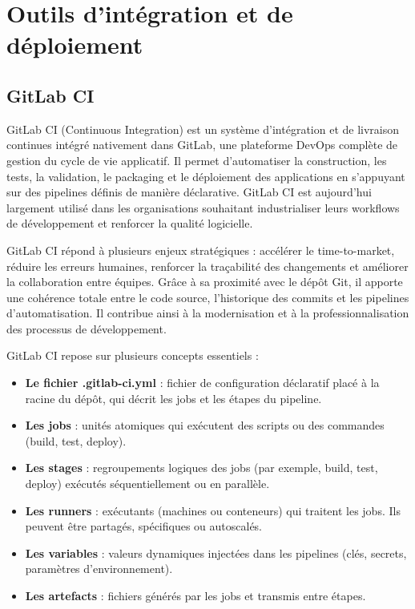 \thispagestyle{mainmatter}

\section{Outils d’intégration et de déploiement}
\subsection{GitLab CI}

GitLab CI (Continuous Integration) est un système d’intégration et de livraison continues intégré nativement dans GitLab, une plateforme DevOps complète de gestion du cycle de vie applicatif. Il permet d’automatiser la construction, les tests, la validation, le packaging et le déploiement des applications en s’appuyant sur des pipelines définis de manière déclarative. GitLab CI est aujourd’hui largement utilisé dans les organisations souhaitant industrialiser leurs workflows de développement et renforcer la qualité logicielle.

GitLab CI répond à plusieurs enjeux stratégiques  : accélérer le time-to-market, réduire les erreurs humaines, renforcer la traçabilité des changements et améliorer la collaboration entre équipes. Grâce à sa proximité avec le dépôt Git, il apporte une cohérence totale entre le code source, l’historique des commits et les pipelines d’automatisation. Il contribue ainsi à la modernisation et à la professionnalisation des processus de développement.

GitLab CI repose sur plusieurs concepts essentiels  :
\begin{itemize}
	\item \textbf{Le fichier .gitlab-ci.yml}  : fichier de configuration déclaratif placé à la racine du dépôt, qui décrit les jobs et les étapes du pipeline.
	\item \textbf{Les jobs}  : unités atomiques qui exécutent des scripts ou des commandes (build, test, deploy).
	\item \textbf{Les stages}  : regroupements logiques des jobs (par exemple, build, test, deploy) exécutés séquentiellement ou en parallèle.
	\item \textbf{Les runners}  : exécutants (machines ou conteneurs) qui traitent les jobs. Ils peuvent être partagés, spécifiques ou autoscalés.
	\item \textbf{Les variables}  : valeurs dynamiques injectées dans les pipelines (clés, secrets, paramètres d’environnement).
	\item \textbf{Les artefacts}  : fichiers générés par les jobs et transmis entre étapes.
\end{itemize}

